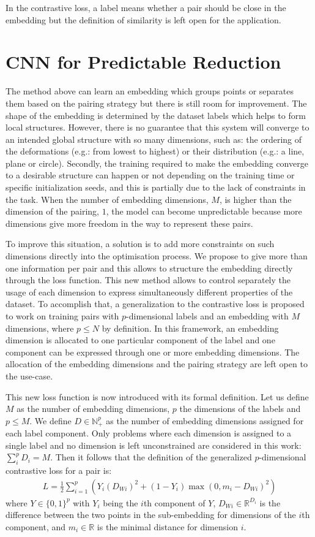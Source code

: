 \documentclass[a4paper,12pt]{report}
\newcommand{\N}{\mathbb{N}}
\newcommand{\R}{\mathbb{R}}
\newcommand{\eg}{e.g.}
\begin{document}
In the contrastive loss, a label means whether a pair should be close in the embedding but the definition of similarity is left open for the application.

\section{CNN for Predictable Reduction}
The method above can learn an embedding which groups points or separates them based on the pairing strategy but there is still room for improvement.
The shape of the embedding is determined by the dataset labels which helps to form local structures.
However, there is no guarantee that this system will converge to an intended global structure with so many dimensions, such as: the ordering of the deformations (\eg: from lowest to highest) or their distribution (\eg: a line, plane or circle).
Secondly, the training required to make the embedding converge to a desirable structure can happen or not depending on the training time or specific initialization seeds, and this is partially due to the lack of constraints in the task.
When the number of embedding dimensions, $M$, is higher than the dimension of the pairing, $1$, the model can become unpredictable because more dimensions give more freedom in the way to represent these pairs.

To improve this situation, a solution is to add more constraints on such dimensions directly into the optimisation process.
We propose to give more than one information per pair and this allows to structure the embedding directly through the loss function.
This new method allows to control separately the usage of each dimension to express simultaneously different properties of the dataset.
To accomplish that, a generalization to the contrastive loss is proposed to work on training pairs with $p$-dimensional labels and an embedding with $M$ dimensions, where $p \leq N$ by definition.
In this framework, an embedding dimension is allocated to one particular component of the label and one component can be expressed through one or more embedding dimensions.
The allocation of the embedding dimensions and the pairing strategy are left open to the use-case.

This new loss function is now introduced with its formal definition.
Let us define $M$ as the number of embedding dimensions, $p$ the dimensions of the labels and $p \leq M$.
We define $D \in \N_+^p$ as the number of embedding dimensions assigned for each label component.
Only problems where each dimension is assigned to a single label and no dimension is left unconstrained are considered in this work: $\sum_i^p D_i = M$.
Then it follows that the definition of the generalized $p$-dimensional contrastive loss for a pair is:
\begin{eqnarray}
    L = \frac{1}{2} \sum_{i=1}^p \left( Y_i (D_{Wi})^2 + (1-Y_i) \max(0, m_i - D_{Wi})^2 \right)
\end{eqnarray}
where $Y \in \{0,1\}^p$ with $Y_i$ being the $i$th component of $Y$, $D_{Wi} \in \R^{D_i}$ is the difference between the two points in the sub-embedding for dimensions of the $i$th component, and $m_i \in \R$ is the minimal distance for dimension $i$.
\end{document}

